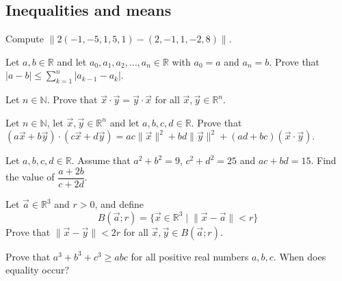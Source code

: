 \subsection*{Inequalities and means}

\begin{chapex}
Compute $\lVert 2({-1},{-5},1,5,1) - (2,{-1},1,{-2},8) \rVert$.
\end{chapex}

\begin{chapex}
Let $a,b \in \mathbb{R}$ and let $a_0,a_1,a_2,\dots,a_n \in \mathbb{R}$ with $a_0=a$ and $a_n=b$. Prove that $|a-b| \le \sum_{k=1}^n |a_{k-1} - a_k|$.
\end{chapex}

\begin{chapex}
Let $n \in \mathbb{N}$. Prove that $\vec x \cdot \vec y = \vec y \cdot \vec x$ for all $\vec x, \vec y \in \mathbb{R}^n$.
\end{chapex}

\begin{chapex}
Let $n \in \mathbb{N}$, let $\vec x, \vec y \in \mathbb{R}^n$ and let $a,b,c,d \in \mathbb{R}$. Prove that $(a \vec x + b \vec y) \cdot (c \vec x + d \vec y) = ac \lVert \vec x \rVert^2 + bd \lVert \vec y \rVert^2 + (ad+bc) (\vec x \cdot \vec y)$.
\end{chapex}

\begin{chapex}
\label{cqCauchySchwarzGivenMagnitudeAndDotProduct}
Let $a,b,c,d \in \mathbb{R}$. Assume that $a^2+b^2 = 9$, $c^2+d^2=25$ and $ac+bd = 15$. Find the value of $\dfrac{a+2b}{c+2d}$.
\end{chapex}

\begin{chapex}
Let $\vec a \in \mathbb{R}^3$ and $r > 0$, and define
\[ B(\vec a; r) = \{ \vec x \in \mathbb{R}^3 \mid \lVert \vec x - \vec a \rVert < r \} \]
Prove that $\lVert \vec x - \vec y \rVert < 2r$ for all $\vec x, \vec y \in B(\vec a; r)$.
\end{chapex}

\begin{chapex}
Prove that $a^3+b^3+c^3 \ge abc$ for all positive real numbers $a,b,c$. When does equality occur?
\end{chapex}

